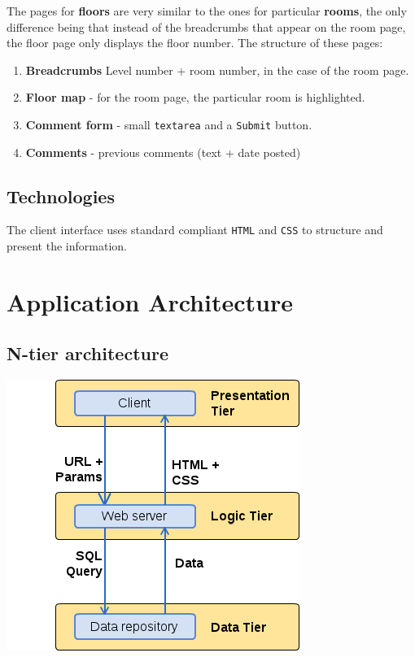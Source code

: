 \documentclass{sig-alt-release2}
\begin{document}
The pages for \textbf{floors} are very similar to the ones for particular
\textbf{rooms}, the only difference being that
instead of the breadcrumbs that appear on the room page, the floor page only 
displays the floor number. The structure of these pages:
\begin{enumerate} \itemsep1pt \parskip0pt 
	\item{\textbf{Breadcrumbs} Level number + room number, in the case of 
	the room page.}
	\item{\textbf{Floor map} - for the room page, the particular room is
	highlighted.}
	\item{\textbf{Comment form} - small \texttt{textarea} and a 
	\texttt{Submit} button.}
	\item{\textbf{Comments} - previous comments (text + date posted)}
\end{enumerate}

\subsection*{Technologies}
The client interface uses standard compliant \texttt{HTML} and \texttt{CSS} to
structure and present the information. 


\section{Application Architecture}

\subsection*{N-tier architecture}


\begin{center}
\includegraphics[scale=0.55]{img/ntier.png}
\end{center}
\end{document}

